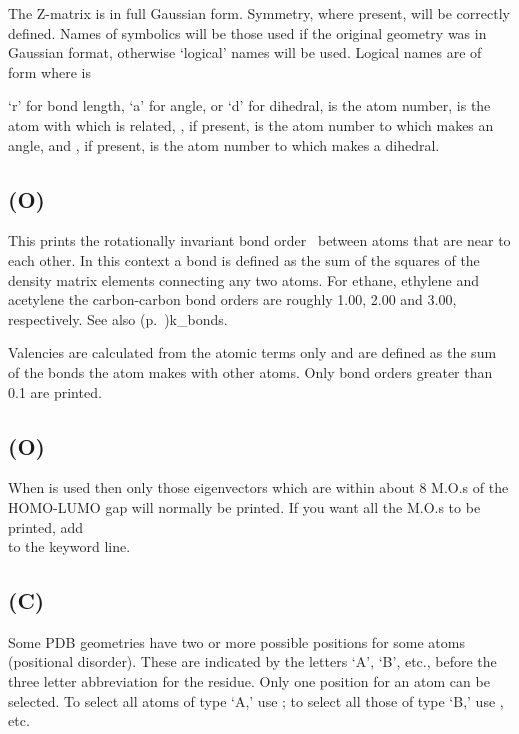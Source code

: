 The Z-matrix is in full Gaussian  form.   Symmetry,  where  present, will  be
correctly defined.  Names of symbolics will be those used if the original
geometry was in Gaussian format, otherwise `logical' names  will be  used.
Logical names are of form  where  is

`r' for bond length, `a' for angle, or `d' for  dihedral,  is the
atom number,  is the atom with which  is related,
,  if present, is the atom number to which  makes an
angle,  and , if present, is the atom number to which 
makes a dihedral.

\subsection*{ (O)}

This prints the rotationally invariant  bond order~\cite{bonds} between
atoms that are near to each other.   In this context a bond is defined
as the sum of the squares of the density matrix  elements  connecting
any  two  atoms.  For  ethane, ethylene  and  acetylene the
carbon-carbon bond orders are roughly 1.00, 2.00 and 3.00,
respectively. See also \hyperref[pageref]{}{ (p.~}{)}{k_bonds}.

Valencies are calculated  from  the atomic terms only and are defined as the
sum of the bonds the atom makes with other  atoms. Only bond orders greater
than 0.1 are printed.

\subsection*{ (O)}
When  is used then only those eigenvectors which are within about
8 M.O.s of the HOMO-LUMO gap will normally be printed. If you want all the
M.O.s to be printed, add \\  to the keyword line.


\subsection*{ (C)}
 Some PDB geometries have two or more possible positions for some atoms
(positional disorder).  These are indicated by the letters `A', `B', etc.,
before the three letter abbreviation for the residue.  Only one position for an
atom can be selected.  To select all atoms of type `A,' use ; to
select all those of type `B,' use , etc.

